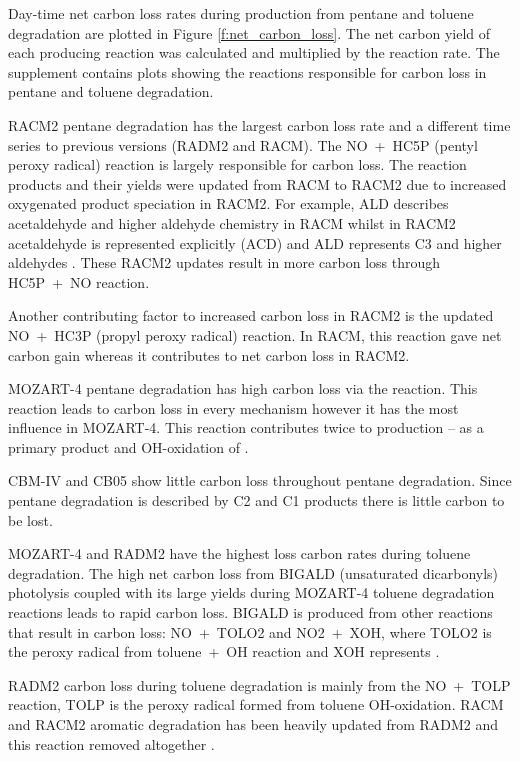 Day-time net carbon loss rates during  production from pentane and toluene degradation are plotted in Figure \ref{f:net_carbon_loss}.
The net carbon yield of each  producing reaction was calculated and multiplied by the reaction rate.
The supplement contains plots showing the reactions responsible for carbon loss in pentane and toluene degradation.

RACM2 pentane degradation has the largest carbon loss rate and a different time series to previous versions (RADM2 and RACM).  
The \mbox{NO + HC5P} (pentyl peroxy radical) reaction is largely responsible for carbon loss.
The reaction products and their yields were updated from RACM to RACM2 due to increased oxygenated product speciation in RACM2.
For example, ALD describes acetaldehyde and higher aldehyde chemistry in RACM whilst in RACM2 acetaldehyde is represented explicitly (ACD) and ALD represents C3 and higher aldehydes \citep{Goliff:2013}.
These RACM2 updates result in more carbon loss through \mbox{HC5P + NO} reaction.

Another contributing factor to increased carbon loss in RACM2 is the updated \mbox{NO + HC3P} (propyl peroxy radical) reaction.
In RACM, this reaction gave net carbon gain whereas it contributes to net carbon loss in RACM2.

MOZART-4 pentane degradation has high carbon loss via the  reaction.
This reaction leads to carbon loss in every mechanism however it has the most influence in MOZART-4. 
This reaction contributes twice to  production -- as a primary product and OH-oxidation of .

CBM-IV and CB05 show little carbon loss throughout pentane degradation.
Since pentane degradation is described by C2 and C1 products there is little carbon to be lost.

MOZART-4 and RADM2 have the highest loss carbon rates during toluene degradation.
The high net carbon loss from BIGALD (unsaturated dicarbonyls) photolysis coupled with its large yields during MOZART-4 toluene degradation reactions leads to rapid carbon loss.
BIGALD is produced from other reactions that result in carbon loss: \mbox{NO + TOLO2} and \mbox{NO2 + XOH}, where TOLO2 is the peroxy radical from \mbox{toluene + OH} reaction and XOH represents  \citep{Emmons:2010}.

RADM2 carbon loss during toluene degradation is mainly from the \mbox{NO + TOLP} reaction, TOLP is the peroxy radical formed from toluene OH-oxidation.
RACM and RACM2 aromatic degradation has been heavily updated from RADM2 and this reaction removed altogether \citep{Stockwell:1997, Goliff:2013}.

